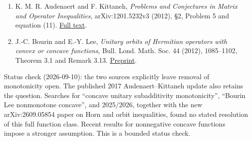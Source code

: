 \documentclass[11pt,a4paper]{article}
\providecommand{\tightlist}{\setlength{\itemsep}{0pt}\setlength{\parskip}{0pt}}
\begin{document}
\begin{enumerate}
\def\labelenumi{\arabic{enumi}.}
\tightlist
\item
  K. M. R. Audenaert and F. Kittaneh, \emph{Problems and Conjectures in
  Matrix and Operator Inequalities}, arXiv:1201.5232v3 (2012), §2,
  Problem 5 and equation (11).
  \href{https://arxiv.org/html/1201.5232}{Full text}.
\item
  J.-C. Bourin and E.-Y. Lee, \emph{Unitary orbits of Hermitian
  operators with convex or concave functions}, Bull. Lond. Math. Soc. 44
  (2012), 1085--1102, Theorem 3.1 and Remark 3.13.
  \href{https://arxiv.org/html/1109.2384}{Preprint}.
\end{enumerate}

Status check (2026-09-10): the two sources explicitly leave removal of
monotonicity open. The published 2017 Audenaert--Kittaneh update also
retains the question. Searches for ``concave unitary subadditivity
monotonicity'', ``Bourin Lee nonmonotone concave'', and 2025/2026,
together with the new arXiv:2609.05854 paper on Horn and orbit
inequalities, found no stated resolution of this full function class.
Recent results for nonnegative concave functions impose a stronger
assumption. This is a bounded status check.
\end{document}
